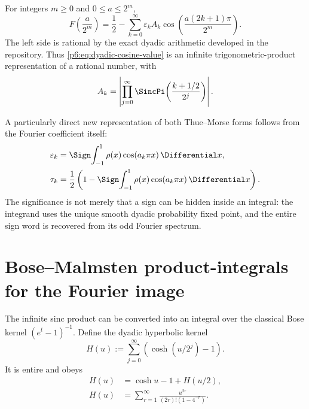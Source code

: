 \documentclass[11pt]{article}
\theoremstyle{definition}
\theoremstyle{remark}
\newcommand{\eps}{\varepsilon}
\begin{document}
\begin{corollary}
\label{p6:cor:dyadic-cosine-products}
For integers \(m\ge0\) and \(0\le a\le2^m\),
\begin{equation}
 F\!\left(\frac{a}{2^m}\right)
 =\frac12-\sum_{k=0}^{\infty}\eps_kA_k
   \cos\!\left(\frac{a(2k+1)\pi}{2^m}\right).             \label{p6:eq:dyadic-cosine-value}
\end{equation}
The left side is rational by the exact dyadic arithmetic developed in the repository.
Thus \eqref{p6:eq:dyadic-cosine-value} is an infinite trigonometric-product representation of
a rational number, with
\begin{equation}
 A_k=\left|
 \prod_{j=0}^{\infty}
 \SincPi\!\left(\frac{k+1/2}{2^j}\right)
 \right|.                                                   \label{p6:eq:Ak-product}
\end{equation}
\end{corollary}

A particularly direct new representation of both Thue--Morse forms follows from the
Fourier coefficient itself:
\begin{align}
 \eps_k
 &=\Sign\!\int_{-1}^{1}\rho(x)\cos(a_k\pi x)\,\Differential x,       \label{p6:eq:tm-up-integral-sign}\\
 \tau_k
 &=\frac12\left(1-
 \Sign\!\int_{-1}^{1}\rho(x)\cos(a_k\pi x)\,\Differential x\right). \label{p6:eq:tm-up-integral-bit}
\end{align}
The significance is not merely that a sign can be hidden inside an integral: the integrand
uses the unique smooth dyadic probability fixed point, and the entire sign word is recovered
from its odd Fourier spectrum.

\section{Bose--Malmsten product-integrals for the Fourier image}
\label{p6:sec:malmsten}

The infinite sinc product can be converted into an integral over the classical Bose kernel
\((e^t-1)^{-1}\).  Define the dyadic hyperbolic kernel
\begin{equation}
 H(u):=\sum_{j=0}^{\infty}\left(\cosh(u/2^j)-1\right).      \label{p6:eq:H-kernel}
\end{equation}
It is entire and obeys
\begin{align}
 H(u)&=\cosh u-1+H(u/2),                                   \label{p6:eq:H-refine}\\
 H(u)&=\sum_{r=1}^{\infty}
       \frac{u^{2r}}{(2r)!(1-4^{-r})}.                     \label{p6:eq:H-power}
\end{align}
\end{document}
